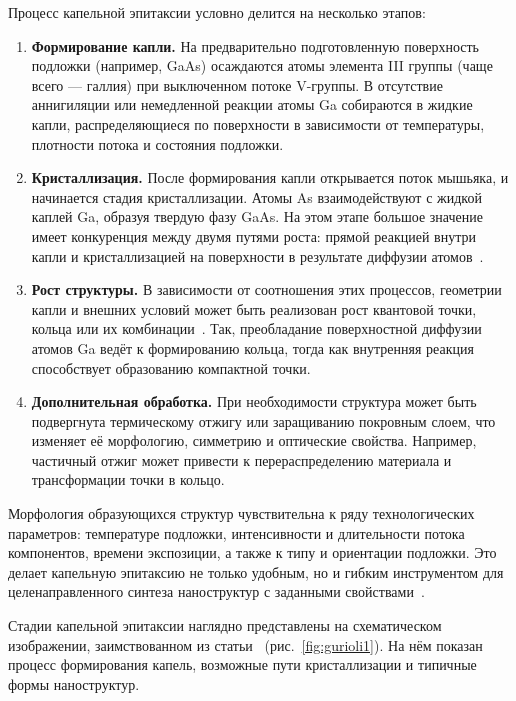 \documentclass[14pt,oneside]{extarticle}
\begin{document}
Процесс капельной эпитаксии условно делится на несколько этапов:

\begin{enumerate}
    \item \textbf{Формирование капли.} На предварительно подготовленную поверхность подложки (например, GaAs) осаждаются атомы элемента III группы (чаще всего — галлия) при выключенном потоке V-группы. В отсутствие аннигиляции или немедленной реакции атомы Ga собираются в жидкие капли, распределяющиеся по поверхности в зависимости от температуры, плотности потока и состояния подложки.
    
    \item \textbf{Кристаллизация.} После формирования капли открывается поток мышьяка, и начинается стадия кристаллизации. Атомы As взаимодействуют с жидкой каплей Ga, образуя твердую фазу GaAs. На этом этапе большое значение имеет конкуренция между двумя путями роста: прямой реакцией внутри капли и кристаллизацией на поверхности в результате диффузии атомов~\cite{Yamagiwa2020}.
    
    \item \textbf{Рост структуры.} В зависимости от соотношения этих процессов, геометрии капли и внешних условий может быть реализован рост квантовой точки, кольца или их комбинации~\cite{Reyes2013}. Так, преобладание поверхностной диффузии атомов Ga ведёт к формированию кольца, тогда как внутренняя реакция способствует образованию компактной точки.
    
    \item \textbf{Дополнительная обработка.} При необходимости структура может быть подвергнута термическому отжигу или заращиванию покровным слоем, что изменяет её морфологию, симметрию и оптические свойства. Например, частичный отжиг может привести к перераспределению материала и трансформации точки в кольцо.
\end{enumerate}

Морфология образующихся структур чувствительна к ряду технологических параметров: температуре подложки, интенсивности и длительности потока компонентов, времени экспозиции, а также к типу и ориентации подложки. Это делает капельную эпитаксию не только удобным, но и гибким инструментом для целенаправленного синтеза наноструктур с заданными свойствами~\cite{sibirmovskiy2014}.

Стадии капельной эпитаксии наглядно представлены на схематическом изображении, заимствованном из статьи~\cite{gurioli2021} (рис.~\ref{fig:gurioli1}). На нём показан процесс формирования капель, возможные пути кристаллизации и типичные формы наноструктур.
\end{document}
